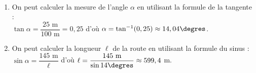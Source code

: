 \ \\ [-5mm]
\begin{enumerate}
   \item On peut calculer la mesure de l'angle $\alpha$ en utilisant la formule de la tangente : \\
   $\tan \alpha =\dfrac{25 \text{ m}}{100 \text{ m}} =0,25$ d'où $\alpha =\tan^{-1}(0,25) \approx14,04\degres$. \\ [1mm]
   \item On peut calculer la longueur $\ell$ de la route en utilisant la formule du sinus : \\ [1mm]
   $\sin\alpha =\dfrac{145 \text{ m}}{\ell}$ d'où $\ell =\dfrac{145 \text{ m}}{\sin 14\degres} \approx 599,4$ m. \\ [1mm]
\end{enumerate}
